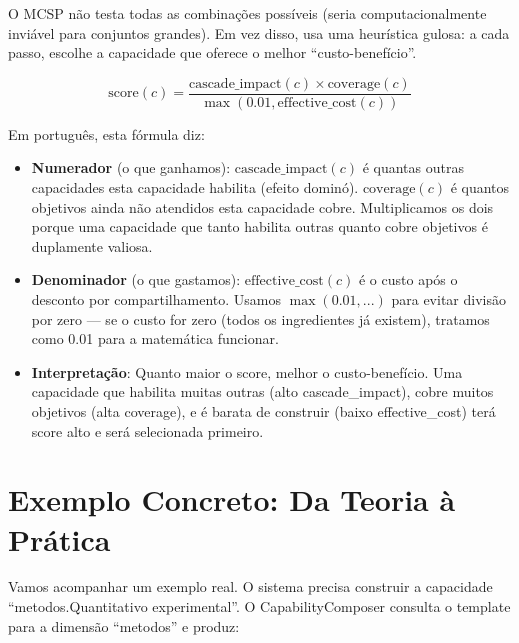 O MCSP não testa todas as combinações possíveis (seria computacionalmente inviável para conjuntos grandes). Em vez disso, usa uma heurística gulosa: a cada passo, escolhe a capacidade que oferece o melhor ``custo-benefício''.

\begin{equation}
\text{score}(c) = \frac{\text{cascade\_impact}(c) \times \text{coverage}(c)}{\max(0.01, \text{effective\_cost}(c))}
\label{eq:greedy_score}
\end{equation}

Em português, esta fórmula diz:

\begin{itemize}
    \item \textbf{Numerador} (o que ganhamos): $\text{cascade\_impact}(c)$ é quantas outras capacidades esta capacidade habilita (efeito dominó). $\text{coverage}(c)$ é quantos objetivos ainda não atendidos esta capacidade cobre. Multiplicamos os dois porque uma capacidade que tanto habilita outras quanto cobre objetivos é duplamente valiosa.
    
    \item \textbf{Denominador} (o que gastamos): $\text{effective\_cost}(c)$ é o custo após o desconto por compartilhamento. Usamos $\max(0.01, ...)$ para evitar divisão por zero — se o custo for zero (todos os ingredientes já existem), tratamos como 0.01 para a matemática funcionar.
    
    \item \textbf{Interpretação}: Quanto maior o score, melhor o custo-benefício. Uma capacidade que habilita muitas outras (alto cascade\_impact), cobre muitos objetivos (alta coverage), e é barata de construir (baixo effective\_cost) terá score alto e será selecionada primeiro.
\end{itemize}

\section{Exemplo Concreto: Da Teoria à Prática}

Vamos acompanhar um exemplo real. O sistema precisa construir a capacidade ``metodos.Quantitativo experimental''. O CapabilityComposer consulta o template para a dimensão ``metodos'' e produz:

